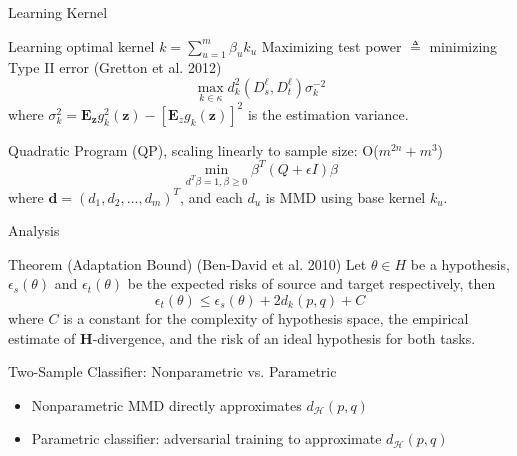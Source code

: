 \documentclass{beamer}
\begin{document}
\begin{frame}[fragile]{Learning Kernel}
\begin{block}{Learning optimal kernel $k = \sum_{u=1}^m\beta_uk_u$}
Maximizing test power $\triangleq$ minimizing Type II error (Gretton et al. 2012)
\begin{equation}
\max\limits_{k \in \kappa}d_k^2(D_s^\ell,D_t^\ell)\sigma_k^{-2}
\end{equation}
where $\sigma_k^2 = \mathbf{E}_{\mathbf{z}}g_k^2(\mathbf{z})-[\mathbf{E}_{z}g_k(\mathbf{z})]^2$ is the estimation variance.
\end{block}
\begin{block}{Quadratic Program (QP), scaling linearly to sample size: O($m^{2n} + m^3$)}
\begin{equation}
\min\limits_{d^T\beta=1,\beta\geq0}\beta^T(Q+\epsilon I)\beta
\end{equation}
where $\mathbf{d} = (d_1, d_2, ..., d_m)^T$, and each $d_u$ is MMD using base kernel $k_u$.
\end{block}
\end{frame}
\begin{frame}[fragile]{Analysis}
\begin{block}{Theorem (Adaptation Bound)}
(Ben-David et al. 2010) Let $\theta \in H$ be a hypothesis, $\epsilon_s(\theta)$ and $\epsilon_t(\theta)$ be the expected risks of source and target respectively, then
\begin{equation}
\epsilon_t(\theta)\leq\epsilon_s(\theta)+2d_k(p,q)+C
\end{equation}
where $C$ is a constant for the complexity of hypothesis space, the empirical
estimate of $\textbf{H}$-divergence, and the risk of an ideal hypothesis for both tasks.
\end{block}
\begin{block}{Two-Sample Classifier: Nonparametric vs. Parametric}
\begin{itemize}
\item{Nonparametric MMD directly approximates $d_\mathcal{H}(p,q)$}
\item{Parametric classifier: adversarial training to approximate $d_\mathcal{H}(p,q)$}
\end{itemize}
\end{block}
\end{frame}
\end{document}
